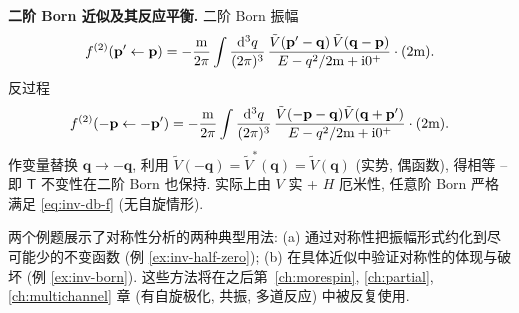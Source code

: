 \begin{example}
\textbf{二阶 Born 近似及其反应平衡.}
二阶 Born 振幅
\begin{equation}
f^{(2)}(\mathbf{p}'\leftarrow \mathbf{p})=-\frac{\mathrm{m}}{2\pi}\int \frac{\mathrm{d}^3q}{(2\pi)^3}\,\frac{\tilde V(\mathbf{p}'-\mathbf{q})\,\tilde V(\mathbf{q}-\mathbf{p})}{E-q^2/2\mathrm{m}+\mathrm{i} 0^+}\cdot (2\mathrm{m}).
\end{equation}
反过程
\[
f^{(2)}(-\mathbf{p}\leftarrow -\mathbf{p}')=-\frac{\mathrm{m}}{2\pi}\int \frac{\mathrm{d}^3q}{(2\pi)^3}\,\frac{\tilde V(-\mathbf{p}-\mathbf{q})\tilde V(\mathbf{q}+\mathbf{p}')}{E-q^2/2\mathrm{m}+\mathrm{i} 0^+}\cdot (2\mathrm{m}).
\]
作变量替换 $\mathbf{q}\to -\mathbf{q}$, 利用 $\tilde V(-\mathbf{q})=\tilde V^*(\mathbf{q})=\tilde V(\mathbf{q})$ (实势, 偶函数), 得相等 -- 即 $\mathsf{T}$ 不变性在二阶 Born 也保持. 实际上由 $V$ 实 + $H$ 厄米性, 任意阶 Born 严格满足 \eqref{eq:inv-db-f} (无自旋情形).
\end{example}

\begin{remark}
两个例题展示了对称性分析的两种典型用法: (a) 通过对称性把振幅形式约化到尽可能少的不变函数 (例 \ref{ex:inv-half-zero}); (b) 在具体近似中验证对称性的体现与破坏 (例 \ref{ex:inv-born}). 这些方法将在之后第~\ref{ch:morespin}, \ref{ch:partial}, \ref{ch:multichannel} 章 (有自旋极化, 共振, 多道反应) 中被反复使用.
\end{remark}
